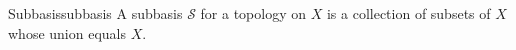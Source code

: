 \begin{definition}
{Subbasis}{subbasis}
A subbasis \(\mathcal{S}\) for a topology on \(X\) is a collection of subsets of
\(X\) whose union equals \(X \). 
\end{definition}
